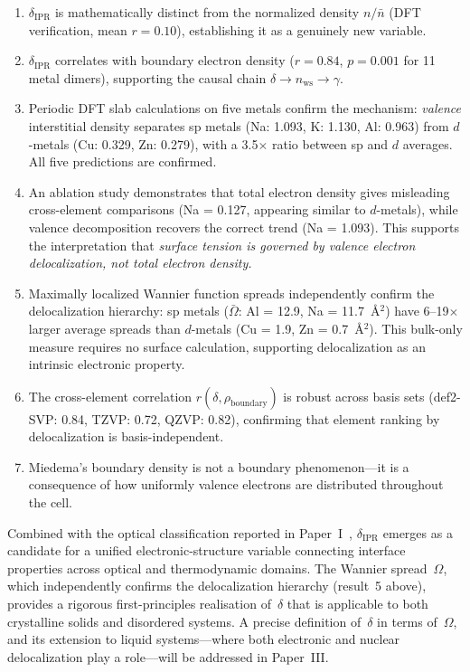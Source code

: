 \documentclass[twocolumn,showpacs,preprintnumbers,amsmath,amssymb,prb]{revtex4-2}
\begin{document}
\begin{enumerate}
  \item $\delta_\mathrm{IPR}$ is mathematically distinct from
    the normalized density $n/\bar{n}$ (DFT verification,
    mean $r = 0.10$), establishing it as a genuinely new variable.

  \item $\delta_\mathrm{IPR}$ correlates with boundary electron
    density ($r = 0.84$, $p = 0.001$ for 11 metal dimers),
    supporting the causal chain
    $\delta \to n_\mathrm{ws} \to \gamma$.

  \item Periodic DFT slab calculations on five metals confirm
    the mechanism:
    \emph{valence} interstitial density separates sp metals
    (Na: 1.093, K: 1.130, Al: 0.963) from $d$-metals
    (Cu: 0.329, Zn: 0.279), with a 3.5$\times$ ratio
    between sp and $d$ averages.
    All five predictions are confirmed.

  \item An ablation study demonstrates that total electron
    density gives misleading cross-element comparisons
    (Na = 0.127, appearing similar to $d$-metals),
    while valence decomposition recovers the correct trend
    (Na = 1.093).
    This supports the interpretation that \emph{surface tension is governed by
    valence electron delocalization, not total electron density.}

  \item Maximally localized Wannier function spreads
    independently confirm the delocalization hierarchy:
    sp metals ($\bar{\Omega}$: Al = 12.9, Na = 11.7~\AA$^2$)
    have 6--19$\times$ larger average spreads than
    $d$-metals (Cu = 1.9, Zn = 0.7~\AA$^2$).
    This bulk-only measure requires no surface calculation,
    supporting delocalization as an intrinsic electronic
    property.

  \item The cross-element correlation $r(\delta, \rho_\mathrm{boundary})$
    is robust across basis sets (def2-SVP: 0.84, TZVP: 0.72,
    QZVP: 0.82), confirming that element ranking by
    delocalization is basis-independent.

  \item Miedema's boundary density is not a boundary
    phenomenon---it is a consequence of how uniformly valence
    electrons are distributed throughout the cell.
\end{enumerate}

Combined with the optical classification reported in
Paper~I~\cite{SentoOpticsPaper1}, $\delta_\mathrm{IPR}$ emerges
as a candidate for a unified electronic-structure variable
connecting interface properties across optical and thermodynamic
domains. The Wannier spread~$\Omega$, which independently confirms
the delocalization hierarchy (result~5 above), provides a rigorous
first-principles realisation of~$\delta$ that is applicable to both
crystalline solids and disordered systems.
A precise definition of~$\delta$ in terms of~$\Omega$, and its
extension to liquid systems---where both electronic and nuclear
delocalization play a role---will be addressed in Paper~III.
\end{document}
